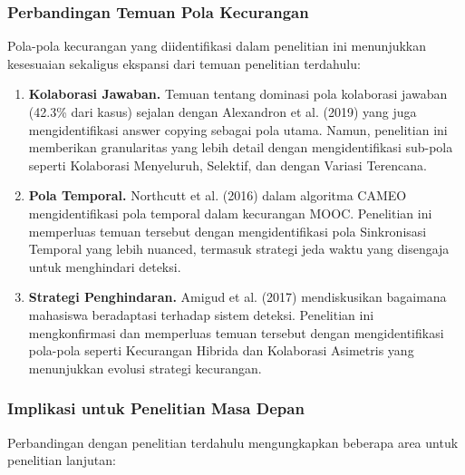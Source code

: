 \subsubsection{Perbandingan Temuan Pola Kecurangan}

Pola-pola kecurangan yang diidentifikasi dalam penelitian ini menunjukkan kesesuaian sekaligus ekspansi dari temuan penelitian terdahulu:

\begin{enumerate}
    \item \textbf{Kolaborasi Jawaban.} Temuan tentang dominasi pola kolaborasi jawaban (42.3\% dari kasus) sejalan dengan Alexandron et al. (2019) yang juga mengidentifikasi answer copying sebagai pola utama. Namun, penelitian ini memberikan granularitas yang lebih detail dengan mengidentifikasi sub-pola seperti Kolaborasi Menyeluruh, Selektif, dan dengan Variasi Terencana.
    
    \item \textbf{Pola Temporal.} Northcutt et al. (2016) dalam algoritma CAMEO mengidentifikasi pola temporal dalam kecurangan MOOC. Penelitian ini memperluas temuan tersebut dengan mengidentifikasi pola Sinkronisasi Temporal yang lebih nuanced, termasuk strategi jeda waktu yang disengaja untuk menghindari deteksi.
    
    \item \textbf{Strategi Penghindaran.} Amigud et al. (2017) mendiskusikan bagaimana mahasiswa beradaptasi terhadap sistem deteksi. Penelitian ini mengkonfirmasi dan memperluas temuan tersebut dengan mengidentifikasi pola-pola seperti Kecurangan Hibrida dan Kolaborasi Asimetris yang menunjukkan evolusi strategi kecurangan.
\end{enumerate}

\subsubsection{Implikasi untuk Penelitian Masa Depan}

Perbandingan dengan penelitian terdahulu mengungkapkan beberapa area untuk penelitian lanjutan:

